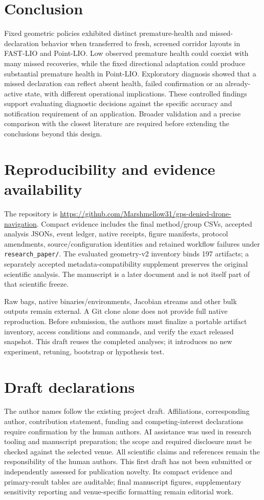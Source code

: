 \documentclass[11pt,a4paper]{article}
\newcommand{\repo}{\url{https://github.com/Marshmellow31/gps-denied-drone-navigation}}
\begin{document}
\section{Conclusion}
Fixed geometric policies exhibited distinct premature-health and
missed-declaration behavior when transferred to fresh, screened corridor
layouts in FAST-LIO and Point-LIO. Low observed premature health could
coexist with many missed recoveries, while the fixed directional adaptation
could produce substantial premature health in Point-LIO. Exploratory
diagnosis showed that a missed declaration can reflect absent health,
failed confirmation or an already-active state, with different operational
implications. These controlled findings support evaluating diagnostic
decisions against the specific accuracy and notification requirement of an
application. Broader validation and a precise comparison with the closest
literature are required before extending the conclusions beyond this design.

\section*{Reproducibility and evidence availability}
The repository is \repo. Compact evidence includes the final method/group
CSVs, accepted analysis JSONs, event ledger, native receipts, figure manifests,
protocol amendments, source/configuration identities and retained workflow
failures under \texttt{research\_paper/}. The evaluated geometry-v2 inventory
binds 197 artifacts; a separately accepted metadata-compatibility supplement
preserves the original scientific analysis. The manuscript is a later
document and is not itself part of that scientific freeze.

Raw bags, native binaries/environments, Jacobian streams and other bulk
outputs remain external. A Git clone alone does not provide full native
reproduction. Before submission, the authors must finalize a portable
artifact inventory, access conditions and commands, and verify the exact
released snapshot. This draft reuses the completed analyses; it introduces
no new experiment, retuning, bootstrap or hypothesis test.

\section*{Draft declarations}
The author names follow the existing project draft. Affiliations,
corresponding author, contribution statement, funding and competing-interest
declarations require confirmation by the human authors. AI assistance was
used in research tooling and manuscript preparation; the scope and required
disclosure must be checked against the selected venue. All scientific
claims and references remain the responsibility of the human authors.
This first draft has not been submitted or independently assessed for
publication novelty. Its compact evidence and primary-result tables are
auditable; final manuscript figures, supplementary sensitivity reporting
and venue-specific formatting remain editorial work.
\end{document}
